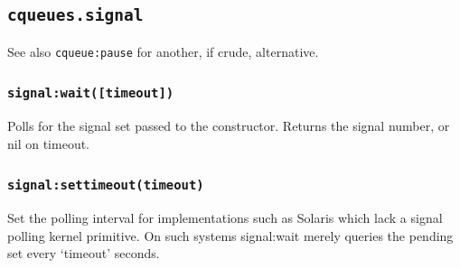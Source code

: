 \documentclass[11pt, oneside]{memoir}
\newcommand*{\routine}[1]{\texttt{#1}\xspace}
\newcommand*{\fn}[1]{\texttt{#1}\xspace}
\newcounter{toccols}
\newenvironment{Module}[1]{
	\subsection{\texttt{#1}}
	\addtocontents{toc}{
		\protect\begin{multicols}{\value{toccols}}
	}
}{
	\addtocontents{toc}{\protect\end{multicols}}
}
\begin{document}
\begin{Module}{cqueues.signal}
See also \routine{cqueue:pause} for another, if crude, alternative.

\subsubsection[\fn{signal:wait}]{\fn{signal:wait([timeout])}}
Polls for the signal set passed to the constructor. Returns the signal number, or nil on timeout.

\subsubsection[\fn{signal:settimeout}]{\fn{signal:settimeout(timeout)}}
Set the polling interval for implementations such as Solaris which lack a signal polling kernel primitive. On such systems signal:wait merely queries the pending set every `timeout' seconds.

\end{Module}
\end{document}
